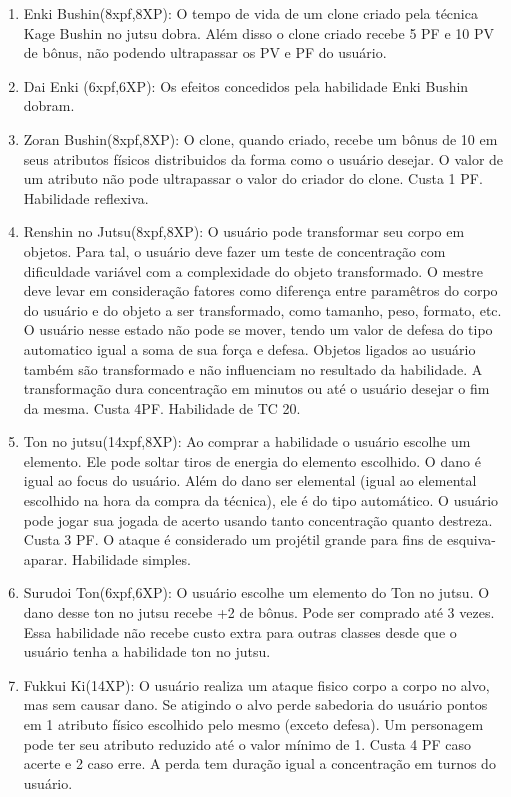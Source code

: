 \begin{enumerate}
	\item Enki Bushin(8xpf,8XP): O tempo de vida de um clone criado pela técnica Kage Bushin no jutsu dobra. Além disso o clone criado recebe 5 PF e 10 PV de bônus, não podendo ultrapassar os PV e PF do usuário.
	
	\item Dai Enki (6xpf,6XP): Os efeitos concedidos pela habilidade Enki Bushin dobram.
	
	\item Zoran Bushin(8xpf,8XP): O clone, quando criado, recebe um bônus de 10 em seus atributos físicos distribuidos da forma como o usuário desejar. O valor de um atributo não pode ultrapassar o valor do criador do clone. Custa 1 PF. Habilidade reflexiva.
	
	\item Renshin no Jutsu(8xpf,8XP): O usuário pode transformar seu corpo em objetos. Para tal, o usuário deve fazer um teste de concentração com dificuldade variável com a complexidade do objeto transformado. O mestre deve levar em consideração fatores como diferença entre paramêtros do corpo do usuário e do objeto a ser transformado, como tamanho, peso, formato, etc. O usuário nesse estado não pode se mover, tendo um valor de defesa do tipo automatico igual a soma de sua força e defesa. Objetos ligados ao usuário também são transformado e não influenciam no resultado da habilidade. A transformação dura concentração em minutos ou até o usuário desejar o fim da mesma. Custa 4PF. Habilidade de TC 20.
	
	\item Ton no jutsu(14xpf,8XP): Ao comprar a habilidade o usuário escolhe um elemento. Ele pode soltar tiros de energia do elemento escolhido. O dano é igual ao focus do usuário. Além do dano ser elemental (igual ao elemental escolhido na hora da compra da técnica), ele é do tipo automático. O usuário pode jogar sua jogada de acerto usando tanto concentração quanto destreza. Custa 3 PF. O ataque é considerado um projétil grande para fins de esquiva-aparar. Habilidade simples.

	\item Surudoi Ton(6xpf,6XP): O usuário escolhe um elemento do Ton no jutsu. O dano desse ton no jutsu recebe +2 de bônus. Pode ser comprado até 3 vezes. Essa habilidade não recebe custo extra para outras classes desde que o usuário tenha a habilidade ton no jutsu.

	\item Fukkui Ki(14XP): O usuário realiza um ataque fisico corpo a corpo no alvo, mas sem causar dano. Se atigindo o alvo perde sabedoria do usuário pontos em 1 atributo físico escolhido pelo mesmo (exceto defesa). Um personagem pode ter seu atributo reduzido até o valor mínimo de 1. Custa 4 PF caso acerte e 2 caso erre. A perda tem duração igual a concentração em turnos do usuário. 


\end{enumerate}
